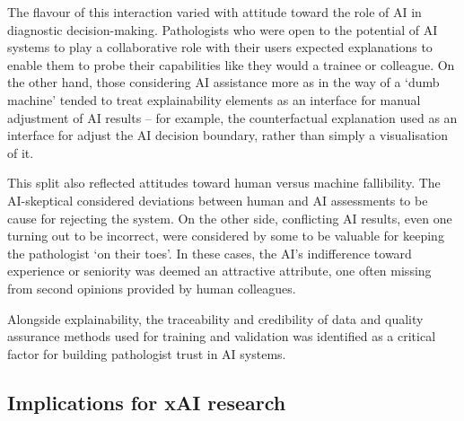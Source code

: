 The flavour of this interaction varied with attitude toward the role of AI in diagnostic decision-making. Pathologists who were open to the potential of AI systems to play a collaborative role with their users expected explanations to enable them to probe their capabilities like they would a trainee or colleague. On the other hand, those considering AI assistance more as in the way of a `dumb machine' tended to treat explainability elements as an interface for manual adjustment of AI results -- for example, the counterfactual explanation used as an interface for adjust the AI decision boundary, rather than simply a visualisation of it.


This split also reflected attitudes toward human versus machine fallibility. The AI-skeptical considered deviations between human and AI assessments to be cause for rejecting the system. On the other side, conflicting AI results, even one turning out to be incorrect, were considered by some to be valuable for keeping the pathologist `on their toes'. In these cases, the AI's indifference toward experience or seniority was deemed an attractive attribute, one often missing from second opinions provided by human colleagues.


Alongside explainability, the traceability and credibility of data and quality assurance methods used for training and validation was identified as a critical factor for building pathologist trust in AI systems.

\subsection{Implications for xAI research}


